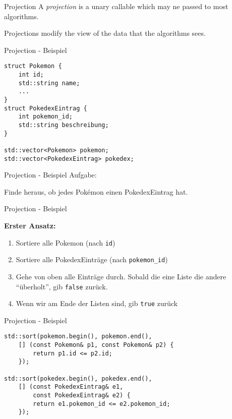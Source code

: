 \begin{frame}{Projection}
    A \emph{projection} is a unary callable which may ne passed to most algorithms.

    \vspace{2.5em}

    Projections modify the view of the data that the algorithms sees.
\end{frame}

\begin{frame}[fragile]{Projection - Beispiel}
    \begin{verbatim}
struct Pokemon {
    int id;
    std::string name;
    ...
}
struct PokedexEintrag {
    int pokemon_id;
    std::string beschreibung;
}

std::vector<Pokemon> pokemon;
std::vector<PokedexEintrag> pokedex;
    \end{verbatim}
\end{frame}

\begin{frame}{Projection - Beispiel}
    Aufgabe:

    Finde heraus, ob jedes Pokémon einen PokedexEintrag hat.
\end{frame}

\begin{frame}{Projection - Beispiel}
    \begin{center}
        \textbf{Erster Ansatz:}
    \end{center}
    \begin{enumerate}
        \item Sortiere alle Pokemon (nach \texttt{id})
        \item Sortiere alle PokedexEinträge (nach \texttt{pokemon\_id})
        \item Gehe von oben alle Einträge durch.
              Sobald die eine Liste die andere \enquote{überholt}, gib \texttt{false} zurück.
        \item Wenn wir am Ende der Listen sind, gib \texttt{true} zurück
    \end{enumerate}
\end{frame}

\begin{frame}[fragile]{Projection - Beispiel}
    \begin{verbatim}
std::sort(pokemon.begin(), pokemon.end(),
    [] (const Pokemon& p1, const Pokemon& p2) {
        return p1.id <= p2.id;
    });

std::sort(pokedex.begin(), pokedex.end(),
    [] (const PokedexEintrag& e1,
        const PokedexEintrag& e2) {
        return e1.pokemon_id <= e2.pokemon_id;
    });
    \end{verbatim}
\end{frame}

